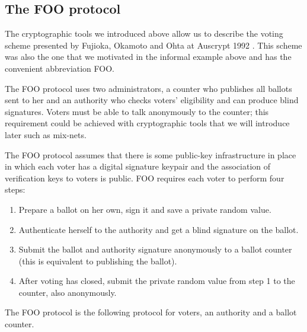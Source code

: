 \documentclass[envcountsame]{llncs}
\begin{document}
\subsection{The FOO protocol}

The cryptographic tools we introduced above allow us to describe the voting
scheme presented by Fujioka, Okamoto and Ohta at Auscrypt 1992 \cite{FOO92}.
This scheme was also the one that we motivated in the informal example above and
has the convenient abbreviation FOO.

The FOO protocol uses two administrators, a counter who publishes all ballots
sent to her and an authority who checks voters' eligibility and can produce
blind signatures. Voters must be able to talk anonymously to the counter; this
requirement could be achieved with cryptographic tools that we will introduce
later such as mix-nets.

The FOO protocol assumes that there is some public-key infrastructure in place
in which each voter has a digital signature keypair and the association of
verification keys to voters is public. FOO requires each voter to perform four
steps:
\begin{enumerate}
\item Prepare a ballot on her own, sign it and save a private random value.
\item Authenticate herself to the authority and get a blind signature on the ballot.
\item Submit the ballot and authority signature anonymously to a ballot counter (this is equivalent to publishing the ballot).
\item After voting has closed, submit the private random value from step 1 to the counter, also anonymously.
\end{enumerate}

\begin{definition}
The FOO protocol is the following protocol for voters, an authority and a ballot
counter.
\end{definition}
\end{document}
